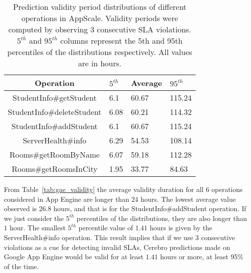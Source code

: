 
\begin{table}[htdp]
\caption{Prediction validity period distributions of different operations in
AppScale. Validity periods were computed by observing $3$ consecutive SLA
violations. $5^{th}$ and $95^{th}$ 
columns represent the 5th and 95th percentiles of the
distributions respectively. All values are in hours.}
\begin{center}
\begin{tabular}{|c|p{1cm}|p{1cm}|p{1cm}|}
\hline
Operation & $5^{th}$ & Average & $95^{th}$ \\ \hline
StudentInfo\#getStudent & 6.1 & 60.67 & 115.24 \\ \hline
StudentInfo\#deleteStudent & 6.08 & 60.21 & 114.32 \\ \hline
StudentInfo\#addStudent & 6.1 & 60.67 & 115.24 \\ \hline
ServerHealth\#info & 6.29 & 54.53 & 108.14 \\ \hline
Rooms\#getRoomByName & 6.07 & 59.18 & 112.28 \\ \hline
Rooms\#getRoomsInCity & 1.95 & 33.77 & 84.63 \\ \hline
\end{tabular}
\end{center}
\label{tab:as_validity}
\end{table}

From Table~\ref{tab:gae_validity} 
the average validity duration for all 6 operations considered in App Engine are
longer than $24$ hours. The lowest average value observed is $26.8$ hours, 
and that is for the StudentInfo\#addStudent operation. If we
just consider the $5^{th}$ percentiles of the distributions, they are 
also longer than $1$ hour. The smallest $5^{th}$ percentile value of 
$1.41$ hours is 
given by the ServerHealth\#info operation. This result implies that if we use 
$3$ consecutive violations as a cue for detecting invalid SLAs,
Cerebro predictions made on Google App Engine would be valid for at least
$1.41$ hours or more, at least 95\% of the time.

